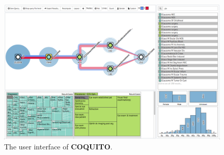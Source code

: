 \begin{figure}[b!]
\centering
\includegraphics[width=0.9\linewidth]{figs/coquito/overview}
\caption{
The user interface of \textbf{COQUITO}.
}
\label{figs:coquito_overview}
\end{figure}%